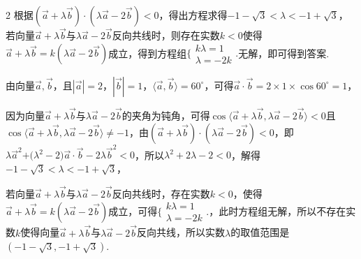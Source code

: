 \begin{multicols}{2}
\bindp [分析]根据\(( \overrightarrow{a} + \lambda\overrightarrow{b} ) \cdot ( \lambda\overrightarrow{a} - 2\overrightarrow{b} ) < 0\)，得出方程求得\(- 1 - \sqrt{3} < \lambda < - 1 + \sqrt{3}\)，若向量\(\overrightarrow{a} + \lambda\overrightarrow{b}\)与\(\lambda\overrightarrow{a} - 2\overrightarrow{b}\)反向共线时，则存在实数\(k < 0\)使得\(\overrightarrow{a} + \lambda\overrightarrow{b} = k(\lambda\overrightarrow{a} - 2\overrightarrow{b})\)成立，得到方程组\(\Bigg\{ \begin{array}{r}
k\lambda = 1 \\
\lambda = - 2k
\end{array} \Bigg.\)无解，即可得到答案.

\bindp [详解]由向量\(\overrightarrow{a},\overrightarrow{b}\)，且\(| \overrightarrow{a} | = 2\)，\(| \overrightarrow{b} | = 1\)，\(\langle \overrightarrow{a},\overrightarrow{b} \rangle = 60^{\circ}\)，可得\(\overrightarrow{a} \cdot \overrightarrow{b} = 2 \times 1 \times \cos 60^{\circ} = 1\)，

\bindp 因为向量\(\overrightarrow{a} + \lambda\overrightarrow{b}\)与\(\lambda\overrightarrow{a} - 2\overrightarrow{b}\)的夹角为钝角，可得\(\cos\langle \overrightarrow{a} + \lambda\overrightarrow{b},\lambda\overrightarrow{a} - 2\overrightarrow{b} \rangle < 0\)且\(\cos\langle \overrightarrow{a} + \lambda\overrightarrow{b},\lambda\overrightarrow{a} - 2\overrightarrow{b} \rangle \neq - 1\)，由\(( \overrightarrow{a} + \lambda\overrightarrow{b} ) \cdot ( \lambda\overrightarrow{a} - 2\overrightarrow{b} ) < 0\)，即\(\lambda{\overrightarrow{a}}^{2}\text{+(}\lambda^{2} - 2)\overrightarrow{a} \cdot \overrightarrow{b} - 2\lambda{\overrightarrow{b}}^{2} < 0\)，所以\(\lambda^{2} + 2\lambda - 2 < 0\)，解得\(- 1 - \sqrt{3} < \lambda < - 1 + \sqrt{3}\)，

\bindp 若向量\(\overrightarrow{a} + \lambda\overrightarrow{b}\)与\(\lambda\overrightarrow{a} - 2\overrightarrow{b}\)反向共线时，存在实数\(k < 0\)，使得\(\overrightarrow{a} + \lambda\overrightarrow{b} = k(\lambda\overrightarrow{a} - 2\overrightarrow{b})\)成立，可得\(\Bigg\{ \begin{array}{r}
k\lambda = 1 \\
\lambda = - 2k
\end{array} \Bigg.\)，此时方程组无解，所以不存在实数\(k\)使得向量\(\overrightarrow{a} + \lambda\overrightarrow{b}\)与\(\lambda\overrightarrow{a} - 2\overrightarrow{b}\)反向共线，所以实数\(\lambda\)的取值范围是\(( - 1 - \sqrt{3}, - 1 + \sqrt{3} )\).



\end{multicols}
